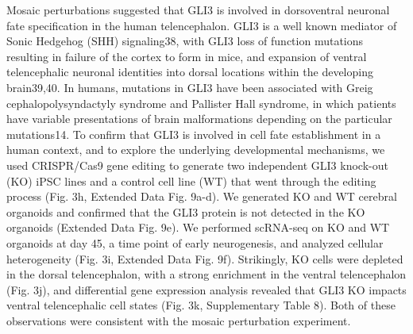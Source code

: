 Mosaic perturbations suggested that GLI3 is involved in dorsoventral neuronal fate specification in the human telencephalon. GLI3 is a well known mediator of Sonic Hedgehog (SHH) signaling38, with GLI3 loss of function mutations resulting in failure of the cortex to form in mice, and expansion of ventral telencephalic neuronal identities into dorsal locations within the developing brain39,40. In humans, mutations in GLI3 have been associated with Greig cephalopolysyndactyly syndrome and Pallister Hall syndrome, in which patients have variable presentations of brain malformations depending on the particular mutations14. To confirm that GLI3 is involved in cell fate establishment in a human context, and to explore the underlying developmental mechanisms, we used CRISPR/Cas9 gene editing to generate two independent GLI3 knock-out (KO) iPSC lines  and a control cell line (WT) that went through the editing process (Fig. 3h, Extended Data Fig. 9a-d). We generated KO and WT cerebral organoids and confirmed that the GLI3 protein is not detected in the KO organoids (Extended Data Fig. 9e). We performed scRNA-seq on KO and WT organoids at day 45, a time point of early neurogenesis, and analyzed cellular heterogeneity (Fig. 3i, Extended Data Fig. 9f). Strikingly, KO cells were depleted in the dorsal telencephalon, with a strong enrichment in the ventral telencephalon (Fig. 3j), and differential gene expression analysis revealed that GLI3 KO impacts ventral telencephalic cell states (Fig. 3k, Supplementary Table 8). Both of these observations were consistent with the mosaic perturbation experiment.

